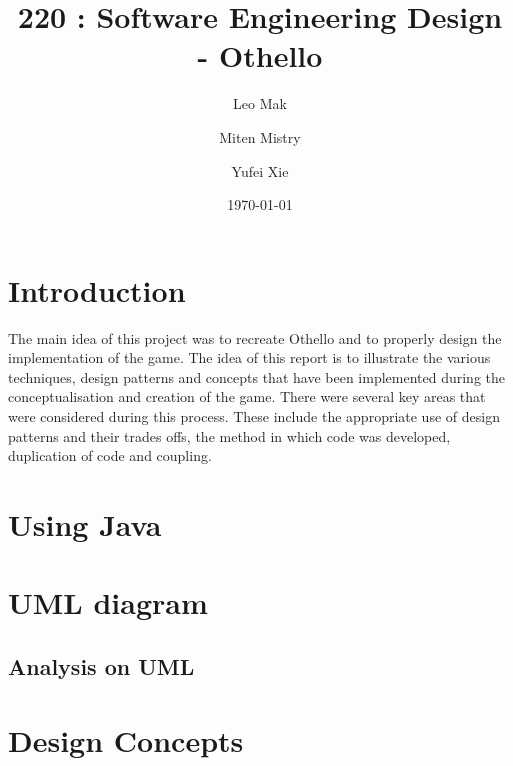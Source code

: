 \documentclass[a4wide, 11pt]{article}
\begin{document}
\title{220 : Software Engineering Design - Othello}

\author{Leo Mak \and Miten Mistry\and Yufei Xie}

\date{\today}         %

\maketitle            %

\section{Introduction}
The main idea of this project was to recreate Othello and to properly design the implementation of the game. The idea of this report is to illustrate the various techniques, design patterns and concepts that have been implemented during the conceptualisation and creation of the game. There were several key areas that were considered during this process. These include the appropriate use of design patterns and their trades offs, the method in which code was developed, duplication of code and coupling.

\section{Using Java}

\section{UML diagram}

\subsection{Analysis on UML}

\section{Design Concepts}
\end{document}
